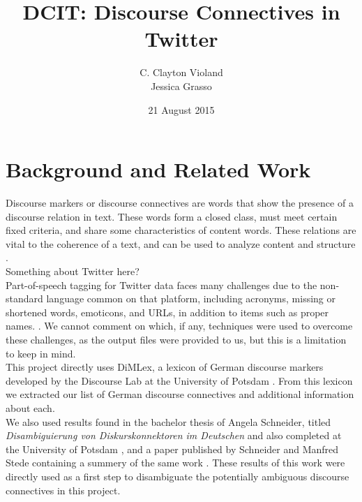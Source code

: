 \documentclass[11pt]{article}
\title{\textbf{DCIT: Discourse Connectives in Twitter}}
\author{C. Clayton Violand  \mono{charles.violand@uni-potsdam.de}
\\Jessica Grasso \mono{jgrasso@uni-potsdam.de}}
\date{21 August 2015}
\begin{document}
\maketitle


\section{Background and Related Work}

Discourse markers or discourse connectives are words that show the presence of a discourse relation in text.  These words form a closed class, must meet certain fixed criteria, and share some characteristics of content words.  These relations are vital to the coherence of a text, and can be used to analyze content and structure \cite{dimlex}. \\

Something about Twitter here?\\

Part-of-speech tagging for Twitter data faces many challenges due to the non-standard language common on that platform, including acronyms, missing or shortened words, emoticons, and URLs, in addition to items such as proper names. \cite{GermanTweetTagging}.  We cannot comment on which, if any, techniques were used to overcome these challenges, as the output files were provided to us, but this is a limitation to keep in mind.\\

This project directly uses DiMLex, a lexicon of German discourse markers developed by the Discourse Lab at the University of Potsdam \cite{dimlex}.  From this lexicon we extracted our list of German discourse connectives and additional information about each.\\

We also used results found in the bachelor thesis of Angela Schneider, titled \emph{Disambiguierung von Diskurskonnektoren im Deutschen} and also completed at the University of Potsdam \cite{schneider1}, and a paper published by Schneider and Manfred Stede containing a summery of the same work \cite{schneider2}.  These results of this work were directly used as a  first step to disambiguate the potentially ambiguous discourse connectives in this project.
\end{document}
